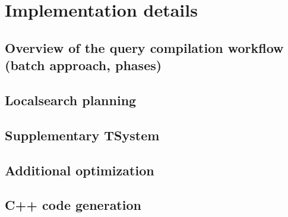 
\chapter{Implementation details}


\section{Overview of the query compilation workflow (batch approach, phases)}
\section{Localsearch planning}
\section{Supplementary TSystem}
\section{Additional optimization}
\section{C++ code generation}






